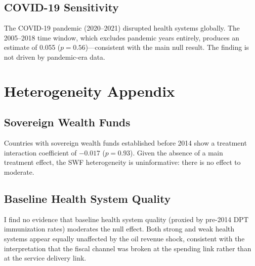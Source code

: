 \documentclass[12pt]{article}
\begin{document}
\subsection{COVID-19 Sensitivity}

The COVID-19 pandemic (2020--2021) disrupted health systems globally. The 2005--2018 time window, which excludes pandemic years entirely, produces an estimate of 0.055 ($p = 0.56$)---consistent with the main null result. The finding is not driven by pandemic-era data.


\section{Heterogeneity Appendix}
\label{app:heterogeneity}

\subsection{Sovereign Wealth Funds}

Countries with sovereign wealth funds established before 2014 show a treatment interaction coefficient of $-0.017$ ($p = 0.93$). Given the absence of a main treatment effect, the SWF heterogeneity is uninformative: there is no effect to moderate.

\subsection{Baseline Health System Quality}

I find no evidence that baseline health system quality (proxied by pre-2014 DPT immunization rates) moderates the null effect. Both strong and weak health systems appear equally unaffected by the oil revenue shock, consistent with the interpretation that the fiscal channel was broken at the spending link rather than at the service delivery link.
\end{document}
